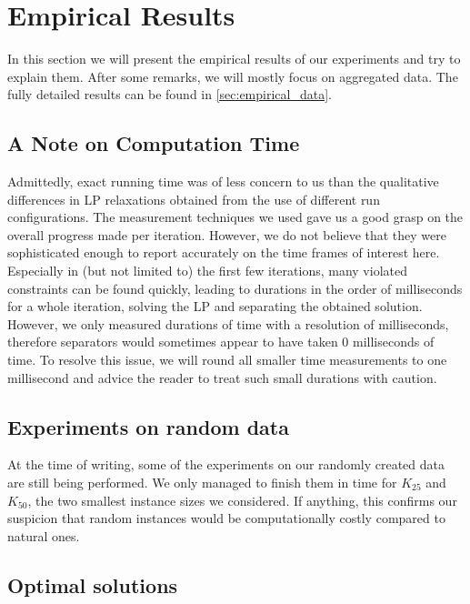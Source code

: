\section{Empirical Results}\label{sec:empirical_results}
In this section we will present the empirical results of our experiments and try to explain them.
After some remarks, we will mostly focus on aggregated data.
The fully detailed results can be found in \cref{sec:empirical_data}.

\subsection{A Note on Computation Time}
Admittedly, exact running time was of less concern to us than the qualitative differences in LP relaxations obtained from the use of different run configurations.
The measurement techniques we used gave us a good grasp on the overall progress made per iteration.
However, we do not believe that they were sophisticated enough to report accurately on the time frames of interest here.
Especially in (but not limited to) the first few iterations, many violated constraints can be found quickly,
leading to durations in the order of milliseconds for a whole iteration, \ie solving the LP and separating the obtained solution.
However, we only measured durations of time with a resolution of milliseconds, therefore separators would sometimes appear to have taken 0 milliseconds of time.
To resolve this issue, we will round all smaller time measurements to one millisecond and advice the reader to treat such small durations with caution.

\subsection{Experiments on random data}
At the time of writing, some of the experiments on our randomly created data are still being performed.
We only managed to finish them in time for $K_{25}$ and $K_{50}$, the two smallest instance sizes we considered.
If anything, this confirms our suspicion that random instances would be computationally costly compared to natural ones.

\subsection{Optimal solutions}\label{subsec:optimal_solutions}

